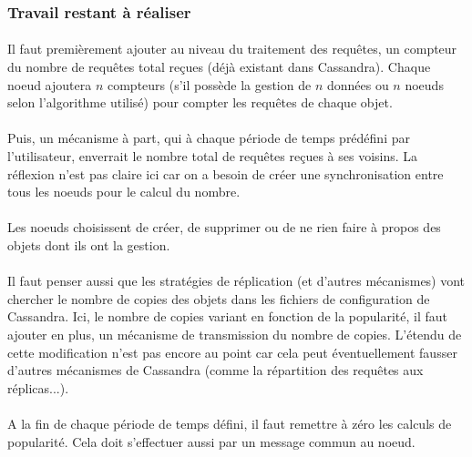 \documentclass[12pt]{article}
\begin{document}
\subsubsection*{Travail restant à réaliser}

\paragraph{}Il faut premièrement ajouter au niveau du traitement des requêtes, un compteur du nombre de requêtes total reçues (déjà existant dans Cassandra). Chaque noeud ajoutera $n$ compteurs (s'il possède la gestion de $n$ données ou $n$ noeuds selon l'algorithme utilisé) pour compter les requêtes de chaque objet.

\paragraph{}Puis, un mécanisme à part, qui à chaque période de temps prédéfini par l'utilisateur, enverrait le nombre total de requêtes reçues à ses voisins. La réflexion n'est pas claire ici car on a besoin de créer une synchronisation entre tous les noeuds pour le calcul du nombre.

\paragraph{}Les noeuds choisissent de créer, de supprimer ou de ne rien faire à propos des objets dont ils ont la gestion.

\paragraph{}Il faut penser aussi que les stratégies de réplication (et d'autres mécanismes) vont chercher le nombre de copies des objets dans les fichiers de configuration de Cassandra. Ici, le nombre de copies variant en fonction de la popularité, il faut ajouter en plus, un mécanisme de transmission du nombre de copies. L'étendu de cette modification n'est pas encore au point car cela peut éventuellement fausser d'autres mécanismes de Cassandra (comme la répartition des requêtes aux réplicas...).

\paragraph{}A la fin de chaque période de temps défini, il faut remettre à zéro les calculs de popularité. Cela doit s'effectuer aussi par un message commun au noeud.
\end{document}
